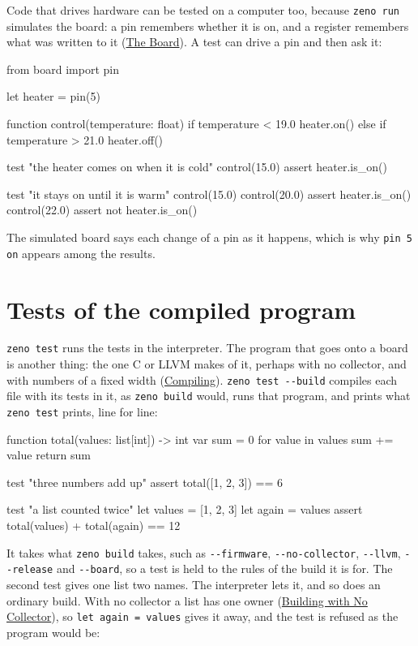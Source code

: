 Code that drives hardware can be tested on a computer too, because
\verb|zeno run| simulates the board: a pin remembers whether it is on,
and a register remembers what was written to it
(\hyperref[ch-board]{The Board}). A test can drive a pin and then ask
it:

\begin{zeno}[file=heater.zeno, dir=board, cmd=zeno test {file}]
from board import pin

let heater = pin(5)

function control(temperature: float) {
    if temperature < 19.0 {
        heater.on()
    } else if temperature > 21.0 {
        heater.off()
    }
}

test "the heater comes on when it is cold" {
    control(15.0)
    assert heater.is_on()
}

test "it stays on until it is warm" {
    control(15.0)
    control(20.0)
    assert heater.is_on()
    control(22.0)
    assert not heater.is_on()
}
\end{zeno}

The simulated board says each change of a pin as it happens, which is
why \verb|pin 5 on| appears among the results.

\section{Tests of the compiled program}

\verb|zeno test| runs the tests in the interpreter. The program that
goes onto a board is another thing: the one C or LLVM makes of it,
perhaps with no collector, and with numbers of a fixed width
(\hyperref[ch-compiling]{Compiling}). \verb|zeno test --build|
compiles each file with its tests in it, as \verb|zeno build| would,
runs that program, and prints what \verb|zeno test| prints, line for
line:

\begin{zeno}[file=total.zeno, dir=build, cmd=zeno test --build {file}]
function total(values: list[int]) -> int {
    var sum = 0
    for value in values {
        sum += value
    }
    return sum
}

test "three numbers add up" {
    assert total([1, 2, 3]) == 6
}

test "a list counted twice" {
    let values = [1, 2, 3]
    let again = values
    assert total(values) + total(again) == 12
}
\end{zeno}

It takes what \verb|zeno build| takes, such as \verb|--firmware|,
\verb|--no-collector|, \verb|--llvm|, \verb|--release| and
\verb|--board|, so a test is held to the rules of the build it is for.
The second test gives one list two names. The interpreter lets it,
and so does an ordinary build. With no collector a list has one owner
(\hyperref[ch-no-collector]{Building with No Collector}), so \verb|let again = values|
gives it away, and the test is refused as the program would be:

